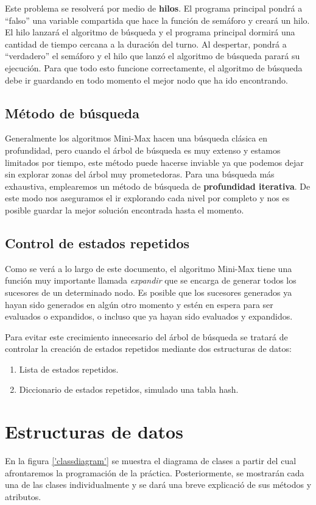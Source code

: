 Este problema se resolverá por medio de \textbf{hilos}. El programa
principal pondrá a ``falso'' una variable compartida que hace la
función de semáforo y creará un hilo. El hilo lanzará el algoritmo de
búsqueda y el programa principal dormirá una cantidad de tiempo cercana a la
duración del turno. Al despertar, pondrá a ``verdadero'' el semáforo y
el hilo que lanzó el algoritmo de búsqueda parará su ejecución. Para
que todo esto funcione correctamente, el algoritmo de búsqueda debe ir
guardando en todo momento el mejor nodo que ha ido encontrando.

\subsection{Método de búsqueda}
Generalmente los algoritmos Mini-Max hacen una búsqueda clásica en
profundidad, pero cuando el árbol de búsqueda es muy extenso y estamos
limitados por tiempo, este método puede hacerse inviable ya que
podemos dejar sin explorar zonas del árbol muy prometedoras. Para una
búsqueda más exhaustiva, emplearemos un método de búsqueda de
\textbf{profundidad iterativa}. De este modo nos aseguramos el ir
explorando cada nivel por completo y nos es posible guardar la mejor
solución encontrada hasta el momento.

\subsection{Control de estados repetidos}
\label{sec:estadosrepetidos}
Como se verá a lo largo de este documento, el algoritmo Mini-Max tiene
una función muy importante llamada \emph{expandir} que se encarga de
generar todos los sucesores de un determinado nodo. Es posible que los
sucesores generados ya hayan sido generados en algún otro momento y
estén en espera para ser evaluados o expandidos, o incluso que ya
hayan sido evaluados y expandidos.

Para evitar este crecimiento innecesario del árbol de búsqueda se
tratará de controlar la creación de estados repetidos mediante dos
estructuras de datos:
\begin{enumerate}
\item Lista de estados repetidos.
\item Diccionario de estados repetidos, simulado una tabla hash.
\end{enumerate}

\section {Estructuras de datos}
En la figura \ref{'classdiagram'} se  muestra el diagrama de clases a
partir del cual afrontaremos la programación de la práctica. Posteriormente, se
mostrarán cada una de las clases individualmente y se dará una breve
explicació de sus métodos y atributos.

